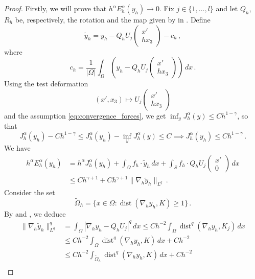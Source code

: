 \documentclass{article}
\theoremstyle{plain}
\theoremstyle{plain}
\theoremstyle{plain}
\theoremstyle{plain}
\theoremstyle{plain}
\theoremstyle{definition}
\theoremstyle{definition}
\DeclareMathOperator{\dist}{dist}
\begin{document}
\begin{proof}
	Firstly, we will prove that $h^\alpha E_h^\alpha(y_h) \to 0$. Fix $j \in \{1, \dots, l\}$ and let $Q_h$, $R_h$ be, respectively, the rotation and the map given by in . Define
	\[
	\tilde y_h = y_h  - Q_h U_j\begin{pmatrix}
	x' \\ h x_3
	\end{pmatrix} - c_h \,,
	\] 
	where
	\[
	c_h = \dfrac{1}{|\Omega|}\int_\Omega \left(y_h - Q_h U_j \begin{pmatrix}
	x' \\ hx_3
	\end{pmatrix}\right) \, dx \,.
	\]
	Using the test deformation
	\[
	(x', x_3) \mapsto U_j \begin{pmatrix}
	x' \\ hx_3
	\end{pmatrix}
	\]
	and the assumption \eqref{eq:convergence_forces}, we get $\inf_y J_h^\alpha(y) \leq Ch^{1-\gamma}$, so that
	\[
		J_h^\alpha(y_h) - C h^{1-\gamma} \leq J_h^\alpha(y_h) - \inf_y J_h^\alpha(y) \leq C \implies J_h^\alpha(y_h) \leq Ch^{1-\gamma} \,.
	\]
	We have
	\begin{equation}\label{eq:dim_forze_eq_1}
	\begin{aligned}
	h^\alpha E_h^\alpha(y_h) & = h^\alpha J_h^\alpha(y_h) + \int_\Omega f_h \cdot \tilde y_h \, dx  + \int_S f_h \cdot Q_hU_j \begin{pmatrix}
	x' \\ 0
	\end{pmatrix} \, dx \\
	& \leq Ch^{\gamma+1} + Ch^{\gamma+1}\|\nabla_h \tilde y_h\|_{L^q} \,.
	\end{aligned}
	\end{equation}
	Consider the set
	\[
	\tilde \Omega_h = \{x \in \Omega \colon \dist(\nabla_h y_h, K) \geq 1\}\,.
	\]
	By  and , we deduce
	\begin{equation}\label{eq:dim_forze_eq_2}
		\begin{aligned}
		\|\nabla_h \tilde y_h\|_{L^q}^q & = \int_\Omega |\nabla_h y_h - Q_hU_j|^q \, dx \leq Ch^{-2} \int_\Omega \dist^q(\nabla_h y_h, K_j) \, dx\\
		& \leq Ch^{-2}\int_\Omega \dist^q(\nabla_h y_h, K) \, dx + Ch^{-2}\\
		& \leq Ch^{-2} \int_{\tilde \Omega_h} \dist^q(\nabla_h y_h, K) \, dx + Ch^{-2}\\

\end{aligned}
\end{equation}
\end{proof}
\end{document}

